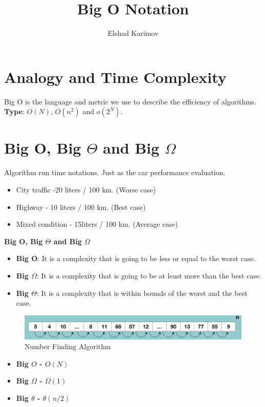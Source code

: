 \documentclass[10pt,letterpaper]{article}
\title{Big O Notation}
\author{Elshad Karimov}
\begin{document}
\begin{titlepage}
\maketitle
\end{titlepage}
\section{Analogy and Time Complexity}
Big O is the language and metric we use to describe the efficiency of algorithms.\\

\textbf{Type}:
$O(N)$, $O(n^{2})$ and $o(2^{N})$.

\section{Big O, Big $\Theta$ and Big $\Omega$}
Algorithm run time notations. Just as the car performance evaluation.
\begin{itemize}
\item City traffic -20 liters / 100 km. (Worse case)
\item Highway - 10 liters / 100 km. (Best case)
\item Mixed condition - 15liters / 100 km. (Average case)
\end{itemize}
\textbf{Big O, Big $\Theta$ and Big $\Omega$}
\begin{itemize}
\item \textbf{Big O}: It is a complexity that is going to be less or equal to the worst case.
\item \textbf{Big $\Omega$}: It is a complexity that is going to be at least more than the best case.
\item \textbf{Big $\Theta$}: It is a complexity that is within bounds of the worst and the best case.
\end{itemize}

\begin{figure}[hbtp]
\caption{Number Finding Algorithm}
\centering
\includegraphics[scale=0.2]{images/Screenshot from 2021-06-30 20-24-08.png}
\end{figure}

\begin{itemize}
\item \textbf{Big $O$ - $O(N)$}
\item \textbf{Big $\Omega$ - $\Omega(1)$}
\item \textbf{Big $\theta$ - $\theta(n/2)$}
\end{itemize}
\end{document}
